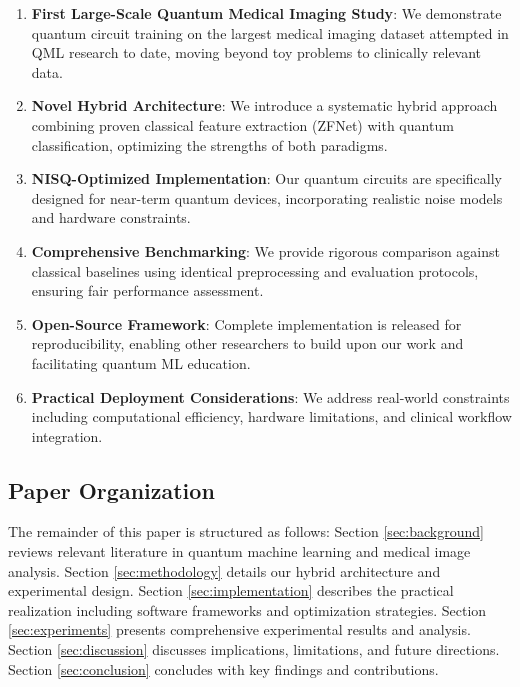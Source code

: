 \documentclass[conference]{IEEEtran}
\begin{document}
\begin{enumerate}
    \item \textbf{First Large-Scale Quantum Medical Imaging Study}: We demonstrate quantum circuit training on the largest medical imaging dataset attempted in QML research to date, moving beyond toy problems to clinically relevant data.
    
    \item \textbf{Novel Hybrid Architecture}: We introduce a systematic hybrid approach combining proven classical feature extraction (ZFNet) with quantum classification, optimizing the strengths of both paradigms.
    
    \item \textbf{NISQ-Optimized Implementation}: Our quantum circuits are specifically designed for near-term quantum devices, incorporating realistic noise models and hardware constraints.
    
    \item \textbf{Comprehensive Benchmarking}: We provide rigorous comparison against classical baselines using identical preprocessing and evaluation protocols, ensuring fair performance assessment.
    
    \item \textbf{Open-Source Framework}: Complete implementation is released for reproducibility, enabling other researchers to build upon our work and facilitating quantum ML education.
    
    \item \textbf{Practical Deployment Considerations}: We address real-world constraints including computational efficiency, hardware limitations, and clinical workflow integration.
\end{enumerate}

\subsection{Paper Organization}

The remainder of this paper is structured as follows: Section \ref{sec:background} reviews relevant literature in quantum machine learning and medical image analysis. Section \ref{sec:methodology} details our hybrid architecture and experimental design. Section \ref{sec:implementation} describes the practical realization including software frameworks and optimization strategies. Section \ref{sec:experiments} presents comprehensive experimental results and analysis. Section \ref{sec:discussion} discusses implications, limitations, and future directions. Section \ref{sec:conclusion} concludes with key findings and contributions.
\end{document}
